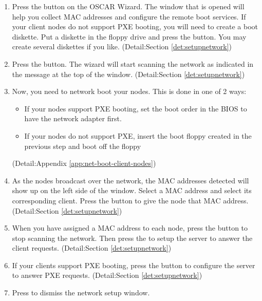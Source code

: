 \begin {enumerate}
\item Press the  button on the OSCAR Wizard.
The window that is opened will help you collect MAC addresses and configure
the remote boot services. If your client nodes do not support PXE booting,
you will need to create a boot diskette. Put a diskette in the floppy
drive and press the  button. You may create 
several diskettes if you like.
(Detail:Section \ref{det:setupnetwork})

\item Press the  button. The wizard will start
scanning the network as indicated in the message at the top of the window. 
(Detail:Section \ref{det:setupnetwork})

\item Now, you need to network boot your nodes. This is done in one of 2 ways:

        \begin{itemize}
        \item If your nodes support PXE booting, set the boot order in the BIOS
        to have the network adapter first.
        \item If your nodes do not support PXE, insert the boot floppy created
        in the previous step and boot off the floppy
        \end{itemize}

(Detail:Appendix \ref{app:net-boot-client-nodes})

\item As the nodes broadcast over the network, the MAC addresses detected will show
up on the left side of the window. Select a MAC address and select its 
corresponding client. Press the  button to give the
node that MAC address. 
(Detail:Section \ref{det:setupnetwork})

\item When you have assigned a MAC address to each node, press the 
button to stop scanning the network. Then press the 
to setup the server to answer the client requests.
(Detail:Section \ref{det:setupnetwork})

\item If your clients support PXE booting, press the  
button to configure the server to answer PXE requests.
(Detail:Section \ref{det:setupnetwork})

\item Press  to dismiss the network setup window.


\end{enumerate}
